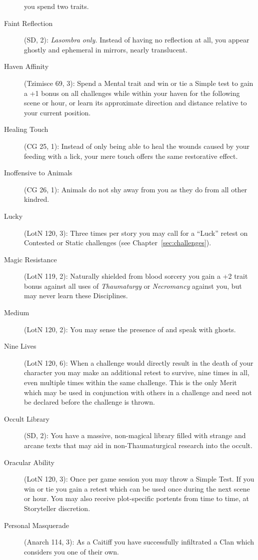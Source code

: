 \begin{description}
	you spend two traits.
	\item[Faint Reflection] (SD, 2):  \emph{Lasombra only.}  Instead of having no reflection 
	at all, you appear ghostly and ephemeral in mirrors, nearly translucent.
	\item[Haven Affinity] (Tzimisce 69, 3):  Spend a Mental trait and win or tie a Simple test to
	gain a +1 bonus on all challenges while within your haven for the following scene or hour, or 
	learn its approximate direction and distance relative to your current position.
	\item[Healing Touch] (CG 25, 1):  Instead of only being able to heal the wounds caused by your 
	feeding with a lick, your mere touch offers the same restorative effect.
	\item[Inoffensive to Animals] (CG 26, 1):  Animals do not shy away from you as they do from all 
	other kindred.
	\item[Lucky] (LotN 120, 3):  Three times per story you may call for a ``Luck'' retest on Contested 
	or Static challenges (see Chapter~\ref{sec:challenges}).
	\item[Magic Resistance] (LotN 119, 2):  Naturally shielded from blood sorcery you gain a +2 
	trait bonus against all uses of \emph{Thaumaturgy} or \emph{Necromancy} against you, but may 
	never learn these Disciplines.
	\item[Medium] (LotN 120, 2):  You may sense the presence of and speak with ghosts.
	\item[Nine Lives] (LotN 120, 6):  When a challenge would directly result in the death of your 
	character you may make an additional retest to survive, nine times in all, even multiple times 
	within the same challenge.  This is the only Merit which may be used in conjunction with others 
	in a challenge and need not be declared before the challenge is thrown.
	\item[Occult Library] (SD, 2):  You have a massive, non-magical library filled with strange and 
	arcane texts that may aid in non-Thaumaturgical research into the occult.
	\item[Oracular Ability] (LotN 120, 3):  Once per game session you may throw a Simple Test.  If you 
	win or tie you gain a retest which can be used once during the next scene or hour.  You may also 
	receive plot-specific portents from time to time, at Storyteller discretion.
	\item[Personal Masquerade] (Anarch 114, 3):  As a Caitiff you have successfully infiltrated a 
	Clan which considers you one of their own.

\end{description}
